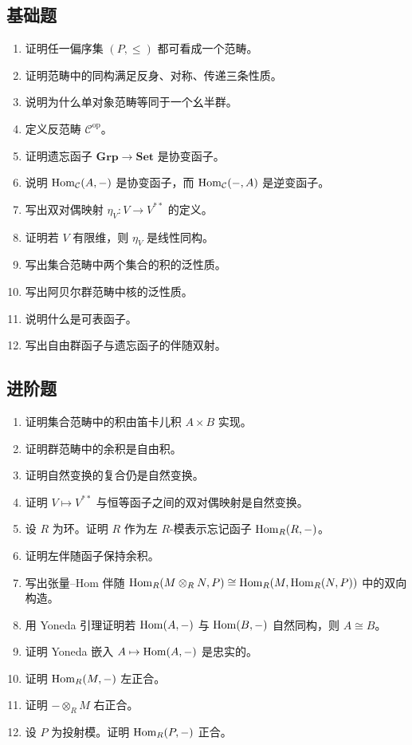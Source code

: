 \subsection*{基础题}
\begin{enumerate}[label=\textbf{A.\arabic*.}, leftmargin=*, itemsep=0.5em]
\item \basic 证明任一偏序集 $(P,\le)$ 都可看成一个范畴。
\item \basic 证明范畴中的同构满足反身、对称、传递三条性质。
\item \basic 说明为什么单对象范畴等同于一个幺半群。
\item \basic 定义反范畴 $\mathcal{C}^{\mathrm{op}}$。
\item \basic 证明遗忘函子 $\mathbf{Grp}\to\mathbf{Set}$ 是协变函子。
\item \basic 说明 $\mathrm{Hom}_{\mathcal{C}}(A,-)$ 是协变函子，而 $\mathrm{Hom}_{\mathcal{C}}(-,A)$ 是逆变函子。
\item \basic 写出双对偶映射 $\eta_V:V\to V^{**}$ 的定义。
\item \basic 证明若 $V$ 有限维，则 $\eta_V$ 是线性同构。
\item \basic 写出集合范畴中两个集合的积的泛性质。
\item \basic 写出阿贝尔群范畴中核的泛性质。
\item \basic 说明什么是可表函子。
\item \basic 写出自由群函子与遗忘函子的伴随双射。
\end{enumerate}

\subsection*{进阶题}
\begin{enumerate}[resume, label=\textbf{A.\arabic*.}, leftmargin=*, itemsep=0.5em]
\item \medium 证明集合范畴中的积由笛卡儿积 $A\times B$ 实现。
\item \medium 证明群范畴中的余积是自由积。
\item \medium 证明自然变换的复合仍是自然变换。
\item \medium 证明 $V\mapsto V^{**}$ 与恒等函子之间的双对偶映射是自然变换。
\item \medium 设 $R$ 为环。证明 $R$ 作为左 $R$-模表示忘记函子 $\mathrm{Hom}_R(R,-)$。
\item \medium 证明左伴随函子保持余积。
\item \medium 写出张量--Hom 伴随
$\mathrm{Hom}_R(M\otimes_R N,P)\cong \mathrm{Hom}_R(M,\mathrm{Hom}_R(N,P))$
中的双向构造。
\item \medium 用 Yoneda 引理证明若 $\mathrm{Hom}(A,-)$ 与 $\mathrm{Hom}(B,-)$ 自然同构，则 $A\cong B$。
\item \medium 证明 Yoneda 嵌入 $A\mapsto \mathrm{Hom}(A,-)$ 是忠实的。
\item \medium 证明 $\mathrm{Hom}_R(M,-)$ 左正合。
\item \medium 证明 $-\otimes_R M$ 右正合。
\item \medium 设 $P$ 为投射模。证明 $\mathrm{Hom}_R(P,-)$ 正合。
\end{enumerate}

